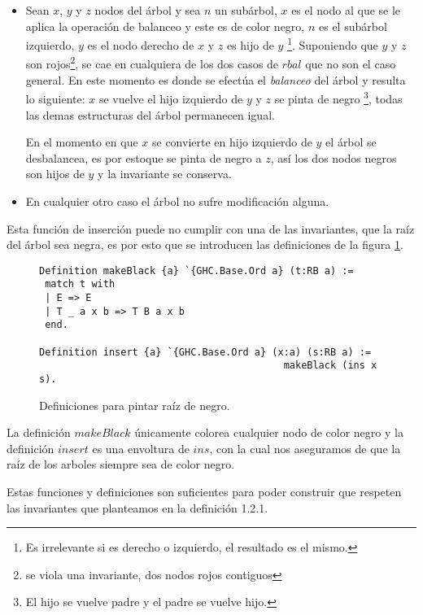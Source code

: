 \begin{itemize}
    \item Sean $x$, $y$ y $z$ nodos del \'arbol y sea $n$ un subárbol, $x$ es el nodo al que se le
    aplica la operaci\'on de balanceo y este es de color negro, $n$ es el subárbol izquierdo, $y$
    es el nodo derecho de $x$ y $z$ es hijo de $y$ \footnote{Es irrelevante si es derecho o
    izquierdo, el resultado es el mismo.}. Suponiendo que $y$ y $z$ son rojos\footnote{se viola una
    invariante, dos nodos rojos contiguos}, se cae en cualquiera de los dos casos de $rbal$ que no
    son el caso general. En este momento es donde se efectúa el \textit{balanceo} del árbol y
    resulta lo siguiente: $x$ se vuelve el hijo izquierdo de $y$ y $z$ se pinta de negro
    \footnote{El hijo se vuelve padre y el padre se vuelve hijo.}, todas las demas estructuras del
    \'arbol permanecen igual.

    En el momento en que $x$ se convierte en hijo izquierdo de $y$ el \'arbol se desbalancea, es
    por estoque se pinta de negro a $z$, así los dos nodos negros son hijos de $y$ y la invariante
    se conserva.
    \item En cualquier otro caso el \'arbol no sufre modificaci\'on alguna.
\end{itemize}

Esta función de inserción puede no cumplir con una de las invariantes, que la raíz del árbol sea
negra, es por esto que se introducen las definiciones de la figura \ref{raiz_negra_func}.

\begin{figure}
\centering
\captionsetup{justification=centering}
\begin{verbatim}
Definition makeBlack {a} `{GHC.Base.Ord a} (t:RB a) :=
 match t with
 | E => E
 | T _ a x b => T B a x b
 end.

Definition insert {a} `{GHC.Base.Ord a} (x:a) (s:RB a) :=
                                          makeBlack (ins x s).
\end{verbatim}
\caption{Definiciones para pintar ra\'iz de negro.}
\label{raiz_negra_func}
\end{figure}

La definici\'on $makeBlack$ únicamente colorea cualquier nodo de color negro y la definición
$insert$ es una envoltura de $ins$, con la cual nos aseguramos de que la ra\'iz de los arboles
siempre sea de color negro.

Estas funciones y definiciones son suficientes para poder construir {\arns} que respeten las
invariantes que planteamos en la definici\'on 1.2.1.
